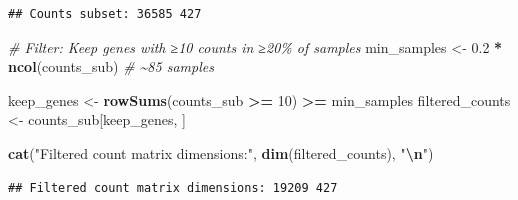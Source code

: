 \documentclass[
]{article}
\newenvironment{Shaded}{\begin{snugshade}}{\end{snugshade}}
\newcommand{\AttributeTok}[1]{\textcolor[rgb]{0.13,0.29,0.53}{#1}}
\newcommand{\CommentTok}[1]{\textcolor[rgb]{0.56,0.35,0.01}{\textit{#1}}}
\newcommand{\DecValTok}[1]{\textcolor[rgb]{0.00,0.00,0.81}{#1}}
\newcommand{\FloatTok}[1]{\textcolor[rgb]{0.00,0.00,0.81}{#1}}
\newcommand{\FunctionTok}[1]{\textcolor[rgb]{0.13,0.29,0.53}{\textbf{#1}}}
\newcommand{\NormalTok}[1]{#1}
\newcommand{\OtherTok}[1]{\textcolor[rgb]{0.56,0.35,0.01}{#1}}
\newcommand{\SpecialCharTok}[1]{\textcolor[rgb]{0.81,0.36,0.00}{\textbf{#1}}}
\newcommand{\StringTok}[1]{\textcolor[rgb]{0.31,0.60,0.02}{#1}}
\begin{document}
\begin{Shaded}
\end{Shaded}

\begin{verbatim}
## Counts subset: 36585 427
\end{verbatim}

\begin{Shaded}
\begin{Highlighting}[]
\CommentTok{\# Filter: Keep genes with ≥10 counts in ≥20\% of samples}
\NormalTok{min\_samples }\OtherTok{\textless{}{-}} \FloatTok{0.2} \SpecialCharTok{*} \FunctionTok{ncol}\NormalTok{(counts\_sub)   }\CommentTok{\# \textasciitilde{}85 samples}

\NormalTok{keep\_genes }\OtherTok{\textless{}{-}} \FunctionTok{rowSums}\NormalTok{(counts\_sub }\SpecialCharTok{\textgreater{}=} \DecValTok{10}\NormalTok{) }\SpecialCharTok{\textgreater{}=}\NormalTok{ min\_samples }
\NormalTok{filtered\_counts }\OtherTok{\textless{}{-}}\NormalTok{ counts\_sub[keep\_genes, ]}

\FunctionTok{cat}\NormalTok{(}\StringTok{"Filtered count matrix dimensions:"}\NormalTok{, }\FunctionTok{dim}\NormalTok{(filtered\_counts), }\StringTok{"}\SpecialCharTok{\textbackslash{}n}\StringTok{"}\NormalTok{)}
\end{Highlighting}
\end{Shaded}

\begin{verbatim}
## Filtered count matrix dimensions: 19209 427
\end{verbatim}

\begin{Shaded}
\end{Shaded}
\end{document}

